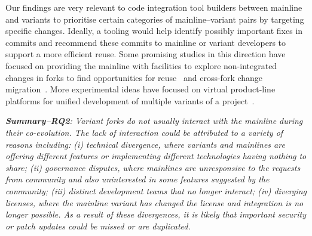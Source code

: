 Our findings are very relevant to code integration tool builders between mainline and variants to prioritise certain categories of mainline--variant pairs by targeting specific changes.
Ideally, a tooling would help identify possibly important fixes in commits and recommend these commits to mainline or variant developers to support a more efficient reuse.
Some promising studies in this direction have focused on providing the mainline with facilities to explore non-integrated changes in forks to find opportunities for reuse~\cite{Ren:2018} and cross-fork change migration~\cite{Ren:2019}. More experimental ideas have focused on virtual product-line platforms for unified development of multiple variants of a project~\cite{Antkiewicz:icse:2014,Fischer:saner:2014,Montalvillo:spl:2015,rubin:icse:2013,Stefan:2016:icsme}.


\begin{custombox}
\emph{\textbf{Summary--RQ2}: Variant forks do not usually interact with the mainline during their co-evolution. The lack of interaction could be attributed to a variety of reasons including: (i) technical divergence, where variants and mainlines are offering different features or implementing different technologies having nothing to share; (ii) governance disputes, where mainlines are unresponsive to the requests from community and also uninterested in some features suggested by the community; (iii) distinct development teams that no longer interact; (iv) diverging licenses, where the mainline variant has changed the license and integration is no longer possible.
As a result of these divergences, it is likely that important security or patch updates could be missed or are duplicated.
}
\end{custombox}
